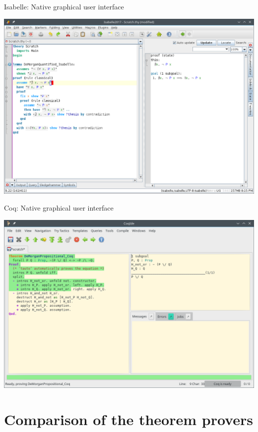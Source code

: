 \documentclass[aspectratio=169, 12pt, fleqn]{beamer}
\begin{document}
\begin{frame}[fragile]{Isabelle: Native graphical user interface}
\begin{center}
\includegraphics[scale=0.4]{img/isabelle_morgan.png}
\end{center}
\end{frame}

\begin{frame}[fragile]{Coq: Native graphical user interface}
\begin{center}
  \includegraphics[scale=0.42]{img/coq_morgan.png}
\end{center}
\end{frame}

\section{Comparison of the theorem provers}
\end{document}
